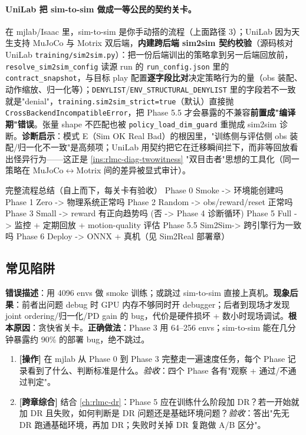 \paragraph{UniLab 把 sim-to-sim 做成一等公民的契约关卡。}在 mjlab/Isaac 里，sim-to-sim 是你手动搭的流程（上面路径 3）；UniLab 因为天生支持 MuJoCo 与 Motrix 双后端，\textbf{内建跨后端 sim2sim 契约校验}（源码核对 UniLab \verb|training/sim2sim.py|）：把一份后端训出的策略拿到另一后端回放前，\verb|resolve_sim2sim_config| 读源 run 的 \verb|run_config.json| 里的 \verb|contract_snapshot|，与目标 play 配置\textbf{逐字段比对}决定策略行为的量（obs 装配、动作缩放、归一化等）；\verb|DENYLIST|/\verb|ENV_STRUCTURAL_DENYLIST| 里的字段若不一致就是"denial"，\verb|training.sim2sim_strict=true|（默认）直接抛 \verb|CrossBackendIncompatibleError|，把 Phase 5.5 才会暴露的不兼容\textbf{前置成"编译期"错误}。张量 shape 不匹配也被 \verb|policy_load_dim_guard| 重抛成 sim2sim 诊断。\textbf{诊断启示}：模式 E（Sim OK Real Bad）的根因里，"训练侧与评估侧 obs 装配/归一化不一致"是高频项；UniLab 用契约把它在迁移瞬间拦下，而非等回放看出怪异行为——这正是 \cref{ins:rlmc-diag-twowitness} "双目击者"思想的工具化（同一策略在 MuJoCo$\leftrightarrow$Motrix 间的差异被显式审计）。

\begin{codebox}[text]{完整流程总结（自上而下，每关卡有验收）}
Phase 0 Smoke    -> 环境能创建吗
Phase 1 Zero     -> 物理系统正常吗
Phase 2 Random   -> obs/reward/reset 正常吗
Phase 3 Small    -> reward 有正向趋势吗  (否 -> Phase 4 诊断循环)
Phase 5 Full     -> 监控 + 定期回放 + motion-quality 评估
Phase 5.5 Sim2Sim-> 跨引擎行为一致吗
Phase 6 Deploy   -> ONNX + 真机（见 Sim2Real 部署章）
\end{codebox}

\subsection{常见陷阱}

\begin{pitfall}
\textbf{错误描述}：用 4096 envs 做 smoke 训练；或跳过 sim-to-sim 直接上真机。\textbf{现象后果}：前者出问题 debug 时 GPU 内存不够同时开 debugger；后者到现场才发现 joint ordering/归一化/PD gain 的 bug，代价是硬件损坏 + 数小时现场调试。\textbf{根本原因}：贪快省关卡。\textbf{正确做法}：Phase 3 用 64--256 envs；sim-to-sim 能在几分钟暴露约 90\% 的部署 bug，绝不跳过。
\end{pitfall}

\begin{practice}[本节动手任务]
\begin{enumerate}
  \item \textbf{[操作]} 在 mjlab 从 Phase 0 到 Phase 3 完整走一遍速度任务，每个 Phase 记录看到了什么、判断标准是什么。\emph{验收}：四个 Phase 各有"观察 + 通过/不通过判定"。
  \item \textbf{[跨章综合]} 结合 \cref{ch:rlmc-dr}：Phase 5 应在训练什么阶段加 DR？若一开始就加 DR 且失败，如何判断是 DR 问题还是基础环境问题？\emph{验收}：答出"先无 DR 跑通基础环境，再加 DR；失败时关掉 DR 复跑做 A/B 区分"。
\end{enumerate}
\end{practice}

